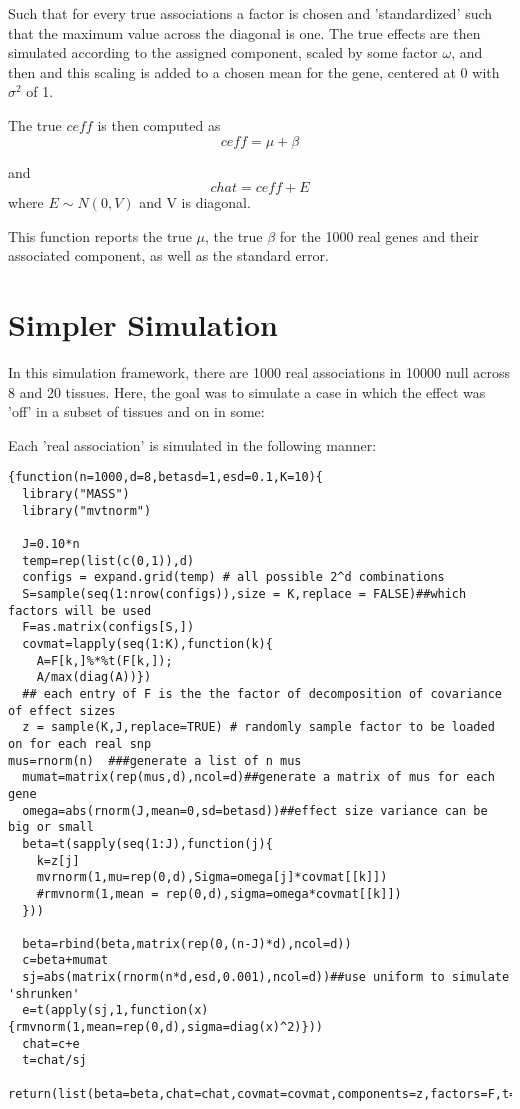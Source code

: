 \documentclass[11pt, oneside]{article}   	%
\begin{document}
  
Such that for every true associations a factor is chosen and 'standardized' such that the maximum value across the diagonal is one. The true effects are then simulated according to the assigned component, scaled by some factor $\omega$, and then and this scaling is added to a chosen mean for the gene, centered at 0 with $\sigma^{2}$ of 1. 

The true $ceff$ is then computed as 
$$ceff = \mu + \beta$$ 

and
$$chat = ceff + E$$ where $E \sim N(0,V)$ and V is diagonal.

This function reports the true $\mu$, the true $\beta$ for the 1000 real genes and their associated component, as well as the standard error.

\section{Simpler Simulation}

 In this simulation framework, there are 1000 real associations in 10000 null across 8 and 20 tissues. Here, the goal was to simulate a case in which the effect was 'off' in a subset of tissues and on in some: 
 
 Each 'real association' is simulated in the following manner:

\begin{verbatim}{function(n=1000,d=8,betasd=1,esd=0.1,K=10){
  library("MASS")
  library("mvtnorm")

  J=0.10*n
  temp=rep(list(c(0,1)),d)
  configs = expand.grid(temp) # all possible 2^d combinations
  S=sample(seq(1:nrow(configs)),size = K,replace = FALSE)##which factors will be used
  F=as.matrix(configs[S,])
  covmat=lapply(seq(1:K),function(k){
    A=F[k,]%*%t(F[k,]);
    A/max(diag(A))})
  ## each entry of F is the the factor of decomposition of covariance of effect sizes
  z = sample(K,J,replace=TRUE) # randomly sample factor to be loaded on for each real snp
mus=rnorm(n)  ###generate a list of n mus
  mumat=matrix(rep(mus,d),ncol=d)##generate a matrix of mus for each gene
  omega=abs(rnorm(J,mean=0,sd=betasd))##effect size variance can be big or small
  beta=t(sapply(seq(1:J),function(j){
    k=z[j]
    mvrnorm(1,mu=rep(0,d),Sigma=omega[j]*covmat[[k]])
    #rmvnorm(1,mean = rep(0,d),sigma=omega*covmat[[k]])
  }))
  
  beta=rbind(beta,matrix(rep(0,(n-J)*d),ncol=d))
  c=beta+mumat
  sj=abs(matrix(rnorm(n*d,esd,0.001),ncol=d))##use uniform to simulate 'shrunken'
  e=t(apply(sj,1,function(x){rmvnorm(1,mean=rep(0,d),sigma=diag(x)^2)}))
  chat=c+e
  t=chat/sj
  return(list(beta=beta,chat=chat,covmat=covmat,components=z,factors=F,t=t,mumat=mumat,shat=sj,error=e,ceff=c,omega=omega))}}\end{verbatim}
%  
  
\end{document}

